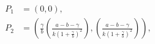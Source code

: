 \documentclass[twocolumn,aps,prl]{revtex4-1}
\newcommand{\tusa}{ \frac{a-b-\gamma}{k(1+\frac{\gamma}{b})^2} }
\begin{document}



$$
\begin{aligned}
    P_1 &= (0, 0) ,\\
    P_2 &= \left( \frac{\gamma}{b} \left( \tusa \right), \left( \tusa \right) \right), \\ 
\end{aligned}
$$







\end{document}
